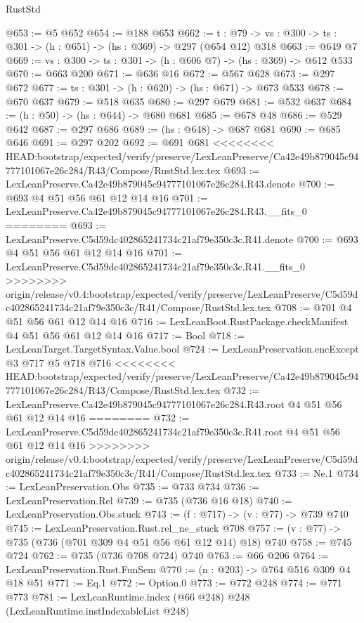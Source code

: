 \begin{lexlean}{RustStd}
\begin{coremodule}
{\begin{coremodule}
@653 := @5 @652
@654 := @188 @653
@662 := {t : @79} -> {vs : @300} -> {ts : @301} -> (h : @651) -> (hs : @369) -> @297 (@654 @12) @318
@663 := @649 @7
@669 := {vs : @300} -> {ts : @301} -> (h : @606 @7) -> (hs : @369) -> @612 @533
@670 := @663 @200
@671 := @636 @16
@672 := @567 @628
@673 := @297 @672
@677 := {ts : @301} -> (h : @620) -> (hs : @671) -> @673 @533
@678 := @670 @637
@679 := @518 @635
@680 := @297 @679
@681 := @532 @637
@684 := (h : @50) -> (hs : @644) -> @680 @681
@685 := @678 @48
@686 := @529 @642
@687 := @297 @686
@689 := (hs : @648) -> @687 @681
@690 := @685 @646
@691 := @297 @202
@692 := @691 @681
<<<<<<<< HEAD:bootstrap/expected/verify/preserve/LexLeanPreserve/Ca42e49b879045c94777101067e26c284/R43/Compose/RustStd.lex.tex
@693 := LexLeanPreserve.Ca42e49b879045c94777101067e26c284.R43.denote
@700 := @693 @4 @51 @56 @61 @12 @14 @16
@701 := LexLeanPreserve.Ca42e49b879045c94777101067e26c284.R43.__fits_0
========
@693 := LexLeanPreserve.C5d59dc402865241734c21af79e350c3c.R41.denote
@700 := @693 @4 @51 @56 @61 @12 @14 @16
@701 := LexLeanPreserve.C5d59dc402865241734c21af79e350c3c.R41.__fits_0
>>>>>>>> origin/release/v0.4:bootstrap/expected/verify/preserve/LexLeanPreserve/C5d59dc402865241734c21af79e350c3c/R41/Compose/RustStd.lex.tex
@708 := @701 @4 @51 @56 @61 @12 @14 @16
@716 := LexLeanBoot.RustPackage.checkManifest @4 @51 @56 @61 @12 @14 @16
@717 := Bool
@718 := LexLeanTarget.TargetSyntax.Value.bool
@724 := LexLeanPreservation.encExcept @3 @717 @5 @718 @716
<<<<<<<< HEAD:bootstrap/expected/verify/preserve/LexLeanPreserve/Ca42e49b879045c94777101067e26c284/R43/Compose/RustStd.lex.tex
@732 := LexLeanPreserve.Ca42e49b879045c94777101067e26c284.R43.root @4 @51 @56 @61 @12 @14 @16
========
@732 := LexLeanPreserve.C5d59dc402865241734c21af79e350c3c.R41.root @4 @51 @56 @61 @12 @14 @16
>>>>>>>> origin/release/v0.4:bootstrap/expected/verify/preserve/LexLeanPreserve/C5d59dc402865241734c21af79e350c3c/R41/Compose/RustStd.lex.tex
@733 := Ne.{1}
@734 := LexLeanPreservation.Obs
@735 := @733 @734
@736 := LexLeanPreservation.Rel
@739 := @735 (@736 @16 @18)
@740 := LexLeanPreservation.Obs.stuck
@743 := (f : @717) -> (v : @77) -> @739 @740
@745 := LexLeanPreservation.Rust.rel_ne_stuck @708
@757 := (v : @77) -> @735 (@736 (@701 @309 @4 @51 @56 @61 @12 @14) @18) @740
@758 := @745 @724
@762 := @735 (@736 @708 @724) @740
@763 := @66 @206
@764 := LexLeanPreservation.Rust.FunSem
@770 := (n : @203) -> @764 @516 @309 @4 @18 @51
@771 := Eq.{1}
@772 := Option.{0}
@773 := @772 @248
@774 := @771 @773
@781 := LexLeanRuntime.index (@66 @248) @248 (LexLeanRuntime.instIndexableList @248)

\end{coremodule}}
\end{coremodule}
\end{lexlean}
